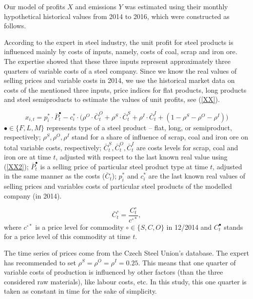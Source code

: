 \documentclass[3p,times]{elsarticle}
\begin{document}

Our model of profits $X$ and emissions $Y$ was estimated using their monthly hypothetical historical values from 2014 to 2016, which were constructed as follows.

According to the expert in steel industry, the unit profit for steel products is influenced mainly by costs of inputs, namely, costs of coal, scrap and iron ore. The expertise showed that these three inputs represent approximately three quarters of variable costs of a steel company. Since we know the real values of selling prices and variable costs in 2014, we use the historical market data on costs of the mentioned three inputs, price indices for flat products, long products and steel semiproducts to estimate the values of unit profits, see (\ref{XX}).

\begin{equation}
x_{i,t}=p_i^* \cdot \bar{P}_t^{\bullet} - c_i^* \cdot \bigl(\rho^{O}\cdot\bar{C}_t^{O}+\rho^{S}\cdot\bar{C}_t^{S}+\rho^{I}\cdot\bar{C}_t^{I}+(1-\rho^{S}-\rho^{O}-\rho^{I})\bigr)
\label{XX}
\end{equation}
$\bullet\in\{F,L,M\}$ represents type of a steel product -- flat, long, or semiproduct, respectively; $\rho^S,\rho^O,\rho^I$ stand for a share of influence of scrap, coal and iron ore on total variable costs, respectively; $\bar{C}_t^{S},\bar{C}_t^{O},\bar{C}_t^{I}$ are costs levels for scrap, coal and iron ore at time $t$, adjusted with respect to the last known real value using (\ref{XX2}); $\bar{P}_t^{\bullet}$ is a selling price of particular steel product type at time $t$, adjusted in the same manner as the costs ($\bar{C}_t$); $p_i^*$ and $c_i^*$ are the last known real values of selling prices and variables costs of particular steel products of the modelled company (in 2014). 

\begin{equation}
\bar{C}_t^{\circ}=\frac{C_t^{\circ}}{c^{\circ *}},
\label{XX2}
\end{equation}
where $c^{\circ *}$ is a price level for commodity $\circ\in\{S,C,O\}$ in 12/2014 and $C_t^{\bullet}$ stands for a price level of this commodity at time $t$.

The time series of prices come from the Czech Steel Union's database. The expert has recommended to set $\rho^S=\rho^O=\rho^I=0.25$. This means that one quarter of variable costs of production is influenced by other factors (than the three considered raw materials), like labour costs, etc. In this study, this one quarter is taken as constant in time for the sake of simplicity.  
\end{document}

